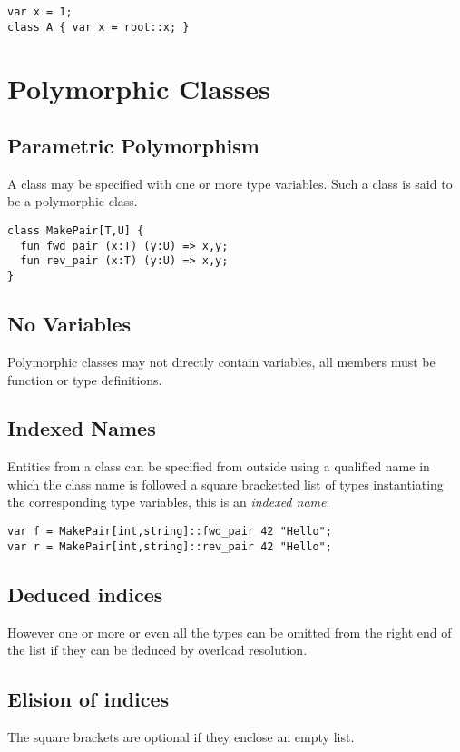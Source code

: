 \documentclass[oneside]{book}
\begin{document}
\begin{verbatim}
var x = 1;
class A { var x = root::x; }
\end{verbatim}

\section{Polymorphic Classes}

\subsection{Parametric Polymorphism}
A class may be specified with one or more type variables.
Such a class is said to be a polymorphic class.

\begin{verbatim}
class MakePair[T,U] {
  fun fwd_pair (x:T) (y:U) => x,y;
  fun rev_pair (x:T) (y:U) => x,y;
}
\end{verbatim}

\subsection{No Variables}
Polymorphic classes may not directly contain variables,
all members must be function or type definitions.

\subsection{Indexed Names}

Entities from a class can be specified from
outside using a qualified name in which the
class name is followed a square bracketted list
of types instantiating the corresponding type
variables, this is an {\em indexed name}:

\begin{verbatim}
var f = MakePair[int,string]::fwd_pair 42 "Hello";
var r = MakePair[int,string]::rev_pair 42 "Hello";
\end{verbatim}

\subsection{Deduced indices}
However one or more or even all the types can be omitted
from the right end of the list if they can be deduced by 
overload resolution. 

\subsection{Elision of indices}
The square brackets are optional if they enclose an
empty list.
\end{document}
